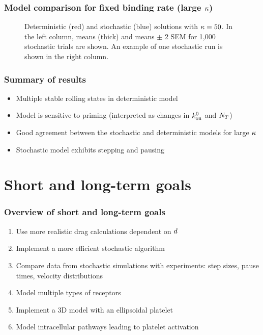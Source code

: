 \documentclass{beamer}
\begin{document}
\begin{frame}
  \frametitle{Model comparison for fixed binding rate (large
    $\kappa$)}
  \begin{figure}
    \centering
    
    \caption{Deterministic (red) and stochastic (blue) solutions with
      $\kappa = 50$. In the left column, means (thick) and means
      $\pm$ 2 SEM for 1,000 stochastic trials are shown. An example of
      one stochastic run is shown in the right column.}
    \label{fig:large-kappa-trials}
  \end{figure}
\end{frame}

\begin{frame}
  \frametitle{Summary of results}
  \begin{itemize}
  \item Multiple stable rolling states in deterministic model
    \vfill
  \item Model is sensitive to priming (interpreted as changes in
    $k_\textnormal{on}^0$ and $N_T$)
    \vfill
  \item Good agreement between the stochastic and deterministic models
    for large $\kappa$
    \vfill
  \item Stochastic model exhibits stepping and pausing
  \end{itemize}
\end{frame}

\section{Short and long-term goals}
\begin{frame}
  \frametitle{Overview of short and long-term goals}
  \begin{enumerate}
  \item Use more realistic drag calculations dependent on
    $d$
    \vfill
  \item Implement a more efficient stochastic algorithm
    \vfill
  \item Compare data from stochastic simulations with experiments:
    step sizes, pause times, velocity distributions
    \vfill
  \item Model multiple types of receptors
    \vfill
  \item Implement a 3D model with an ellipsoidal platelet
    \vfill
  \item Model intracellular pathways leading to platelet activation
  \end{enumerate}
\end{frame}
\end{document}
